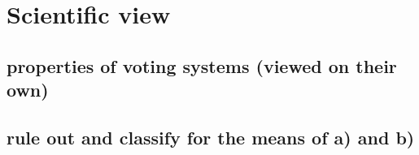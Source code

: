 

\section{Scientific view}
\subsection{properties of voting systems (viewed on their own)} %
\subsection{rule out and classify for the means of a) and b)}
